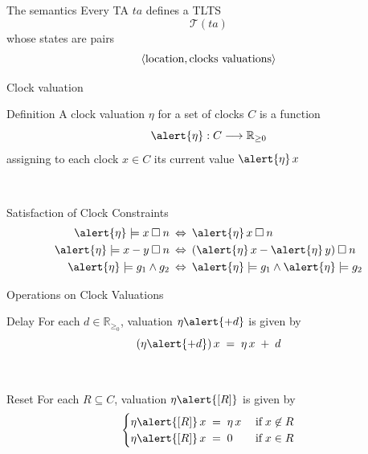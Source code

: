 \documentclass{beamer}
\def\TL#1{\mathcal{T}(#1)}
\begin{document}
\begin{slide}{The semantics}
Every TA $ta$ defines a TLTS 
\begin{equation*}
\TL{ta}
\end{equation*}
whose states are pairs 
\begin{equation*}
\mathopen{\langle}\text{location}, \text{clocks valuations}\mathclose{\rangle}
\end{equation*}
\end{slide}
\begin{slide}{Clock valuation}

\begin{block}{Definition}
A clock valuation \alert{$\eta$} for a set of clocks $C$ is a function 
\begin{equation*}
\fdec{\alert{\eta}}{C}{\mathbb{R}_{\geq 0}}
\end{equation*}
assigning to each clock $x \in C$ its current value $\alert{\eta}\, x$
\end{block}
~\\

\begin{block}{Satisfaction of Clock Constraints}
\begin{align*}
\alert{\eta} \models x \mathbin{\square} n \; & \dimp\; \alert{\eta}\, x \mathbin{\square} n\\
\alert{\eta} \models x-y \mathbin{\square} n \; & \dimp\; (\alert{\eta}\, x - \alert{\eta}\, y) \mathbin{\square} n\\
\alert{\eta} \models g_1 \e g_2 \; & \dimp\; \alert{\eta} \models g_1 \e \alert{\eta} \models g_2
\end{align*}
\end{block}
\end{slide}
\begin{slide}{Operations on Clock Valuations}
\begin{block}{Delay}
For each $d \in \mathbb{R}_{\geq_0}$, valuation $\eta \alert{+ d}$ is given by
\begin{equation*}
(\eta \alert{+ d})\, x\; =\; \eta\, x\; +\; d
\end{equation*}
\end{block}
~\\

\begin{block}{Reset}
For each $R \subseteq C$, valuation $\eta\alert{[R]}$ is given by
\begin{equation*}
\begin{cases}
\eta\alert{[R]}\, x\; =\; \eta\, x & \; \text{if}\; x \not\in R\\
\eta\alert{[R]}\, x\; =\; 0 & \; \text{if}\; x \in R
\end{cases}
\end{equation*}
\end{block}
\end{slide}
\end{document}
